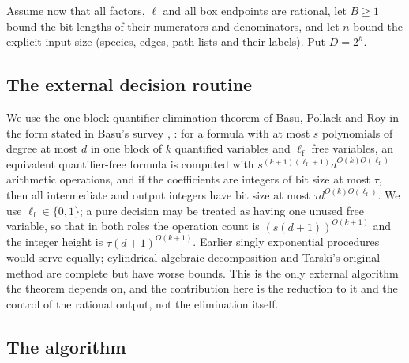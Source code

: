 \documentclass[11pt,a4paper]{article}
\theoremstyle{plain}
\theoremstyle{definition}
\theoremstyle{remark}
\begin{document}
Assume now that all factors, $\ell$ and all box endpoints are rational, let $B\ge1$ bound the bit lengths of their numerators and denominators, and let $n$ bound the explicit input size (species, edges, path lists and their labels). Put $D=2^h$.

\subsection{The external decision routine}\label{sec:backend}

We use the one-block quantifier-elimination theorem of Basu, Pollack and Roy in the form stated in Basu's survey \citep[Theorem 2.27]{basu2014}, \citep[Chapter 14]{bpr2006}: for a formula with at most $s$ polynomials of degree at most $d$ in one block of $k$ quantified variables and $\ell_{\mathrm f}$ free variables, an equivalent quantifier-free formula is computed with $s^{(k+1)(\ell_{\mathrm f}+1)}d^{O(k)O(\ell_{\mathrm f})}$ arithmetic operations, and if the coefficients are integers of bit size at most $\tau$, then all intermediate and output integers have bit size at most $\tau d^{O(k)O(\ell_{\mathrm f})}$. We use $\ell_{\mathrm f}\in\{0,1\}$; a pure decision may be treated as having one unused free variable, so that in both roles the operation count is $(s(d+1))^{O(k+1)}$ and the integer height is $\tau(d+1)^{O(k+1)}$. Earlier singly exponential procedures \citep{grigoriev1988,renegar1992} would serve equally; cylindrical algebraic decomposition \citep{collins1975} and Tarski's original method \citep{tarski1951} are complete but have worse bounds. This is the only external algorithm the theorem depends on, and the contribution here is the reduction to it and the control of the rational output, not the elimination itself.

\subsection{The algorithm}\label{sec:steps}
\end{document}
